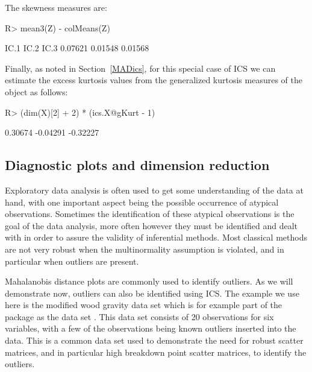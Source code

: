 \documentclass[article,nojss]{jss}
\begin{document}
The skewness measures are:
\begin{Schunk}
\begin{Sinput}
R> mean3(Z) - colMeans(Z)
\end{Sinput}
\begin{Soutput}
   IC.1    IC.2    IC.3 
0.07621 0.01548 0.01568 
\end{Soutput}
\end{Schunk}

Finally, as noted in Section~\ref{MADics}, for this special case of {ICS}
we can estimate the excess kurtosis values from the generalized kurtosis measures
of the  object as follows:
\begin{Schunk}
\begin{Sinput}
R> (dim(X)[2] + 2) * (ics.X@gKurt - 1)
\end{Sinput}
\begin{Soutput}
[1]  0.30674 -0.04291 -0.32227
\end{Soutput}
\end{Schunk}


\subsection{Diagnostic plots and dimension reduction}\label{EXdr}

Exploratory data analysis is often used to get some understanding of the data at hand, with one important aspect being
the possible occurrence of atypical observations. Sometimes the identification of these atypical observations is the goal of
the data analysis, more often however they must be identified and dealt with in order to assure the validity of inferential
methods.  Most classical methods are not very robust when the multinormality assumption is violated, and in particular when
outliers are present.

Mahalanobis distance plots are commonly used to identify outliers. As we will demonstrate now, outliers can also be identified
using ICS. The example we use here is the modified wood gravity data set which is for example part of the  package
as the data set . This data set consists of 20 observations for six variables, with a few of the observations being
known outliers inserted into the data. This is a common data set used to demonstrate the need for robust scatter matrices, and in
particular high breakdown point scatter matrices, to identify the outliers.
\end{document}
